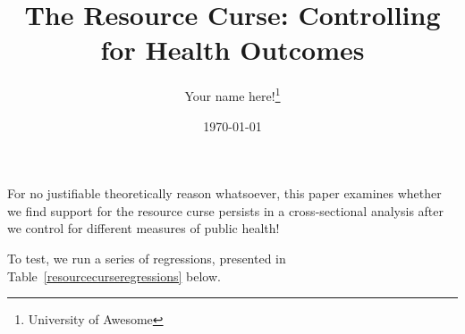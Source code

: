 \documentclass[12pt]{article}
\title{The Resource Curse: Controlling for Health Outcomes}
\author{Your name here!\footnote{University of Awesome}}
\date{\today}
\begin{document}
\maketitle


For no justifiable theoretically reason whatsoever, this paper examines whether we find support for the resource curse persists in a cross-sectional analysis after we control for different measures of public health!

To test, we run a series of regressions, presented in Table~\ref{resourcecurseregressions} below.


\end{document}
